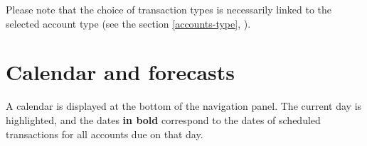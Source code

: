 Please note that the choice of transaction types is necessarily linked to the selected account type (see the section \vref{accounts-type}, ).


\section{Calendar and forecasts\label{plannedtransactions-calendar}}

A calendar is displayed at the bottom of the navigation panel. The current day is \colorbox[RGB]{198,200,201}{highlighted}, and the dates \textbf{in bold} correspond to the dates of scheduled transactions for all accounts due on that day.
	
